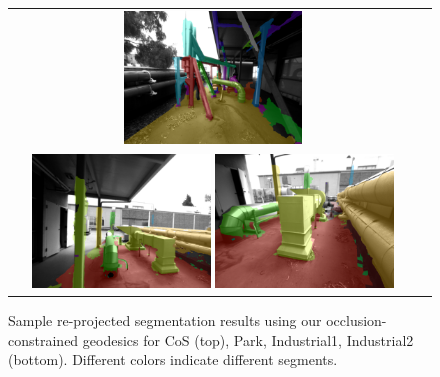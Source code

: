 \begin{figure}
\begin{center}
{{\begin{tabular}{cc}
        		{\includegraphics[width=0.45\textwidth]{figs/pipes2/sceneseg_0045.png}}
        		\\
        		{\includegraphics[width=0.45\textwidth]{figs/pipes3/sceneseg_0007.png}}
        		{\includegraphics[width=0.45\textwidth]{figs/pipes3/sceneseg_0081.png}}
              \end{tabular}
            }
      }
\end{center}
{}
   \caption{\small Sample re-projected segmentation results using our occlusion-constrained geodesics for CoS (top), Park, Industrial1, Industrial2 (bottom). Different colors indicate different segments.}
\label{fig:ourSegs}
{}
\end{figure}
